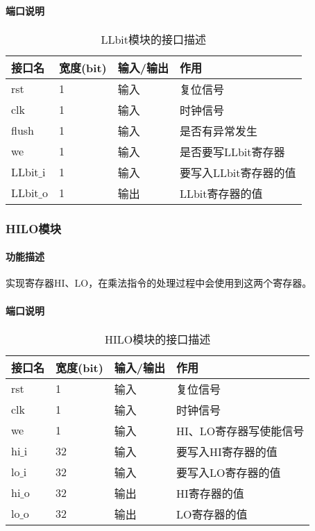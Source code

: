 \quad

\paragraph{端口说明}
\quad

\quad
\begin{table}[H]
	\centering
	\caption{LLbit模块的接口描述}
	\begin{tabular}{|l|l|l|l|}
		\hline
		接口名 & 宽度(bit) & 输入/输出 & 作用 \\
		\hline
		rst & 1 & 输入 & 复位信号 \\
		\hline
		clk & 1 & 输入 & 时钟信号 \\
		\hline
		flush & 1 & 输入 & 是否有异常发生 \\
		\hline
		we & 1 & 输入 & 是否要写LLbit寄存器 \\
		\hline
		LLbit$\_$i & 1 & 输入 & 要写入LLbit寄存器的值 \\
		\hline
		LLbit$\_$o & 1 & 输出 & LLbit寄存器的值 \\
		\hline
	\end{tabular}
\end{table}
\subsubsection{HILO模块}
\paragraph{功能描述}
\quad

\quad

实现寄存器HI、LO，在乘法指令的处理过程中会使用到这两个寄存器。
\paragraph{端口说明}
\quad

\quad
\begin{table}[H]
	\centering
	\caption{HILO模块的接口描述}
	\begin{tabular}{|l|l|l|l|}
		\hline
		接口名 & 宽度(bit) & 输入/输出 & 作用 \\
		\hline
		rst & 1 & 输入 & 复位信号 \\
		\hline
		clk & 1 & 输入 & 时钟信号 \\
		\hline
		we & 1 & 输入 & HI、LO寄存器写使能信号 \\
		\hline
		hi$\_$i & 32 & 输入 & 要写入HI寄存器的值 \\
		\hline
		lo$\_$i & 32 & 输入 & 要写入LO寄存器的值 \\
		\hline
		hi$\_$o & 32 & 输出 & HI寄存器的值 \\
		\hline
		lo$\_$o & 32 & 输出 & LO寄存器的值 \\
		\hline
	\end{tabular}
\end{table}
